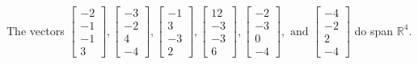 \begin{exercise}
\begin{exerciseStatement}
  \end{exerciseStatement}
  \begin{exerciseAnswer}
   The vectors \(\left[\begin{array}{r}
-2 \\
-1 \\
-1 \\
3
\end{array}\right] , \left[\begin{array}{r}
-3 \\
-2 \\
4 \\
-4
\end{array}\right] , \left[\begin{array}{r}
-1 \\
3 \\
-3 \\
2
\end{array}\right] , \left[\begin{array}{r}
12 \\
-3 \\
-3 \\
6
\end{array}\right] , \left[\begin{array}{r}
-2 \\
-3 \\
0 \\
-4
\end{array}\right] , \text{ and } \left[\begin{array}{r}
-4 \\
-2 \\
2 \\
-4
\end{array}\right]\) 
  	 do  
	span \(\mathbb{R}^4\).
  


  \end{exerciseAnswer}
\end{exercise}